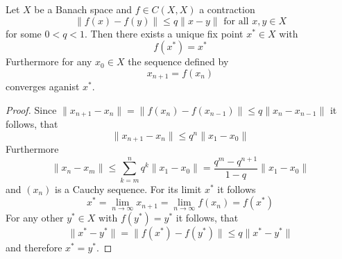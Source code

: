 \begin{theorem}\label{thm:banach_fix_point}
    Let \( X \) be a Banach space and \( f \in C(X,X) \) a contraction
    \[
        \|f(x) - f(y)\| \le q \|x - y\| \text{ for all } x, y \in X
    \]
    for some \( 0 < q < 1 \). Then there exists a unique fix point \( x^* \in X \) with
    \[
        f(x^*) = x^*
    \]
    Furthermore for any \( x_0 \in X \) the sequence defined by
    \[
        x_{n+1} = f(x_n)
    \]
    converges aganist \( x^* \).
\end{theorem}

\begin{proof}
    Since \( \| x_{n+1} - x_n\| =\| f(x_n) - f(x_{n-1})\| \le q\| x_n - x_{n-1}\| \) it follows, that
    \[
        \| x_{n+1} - x_n\| \le q^n  \|x_1 - x_0\|
    \]
    Furthermore
    \[
        \| x_n - x_m\| \le \sum_{k=m}^n q^k \|x_1 - x_0\| = \frac{q^m - q^{n+1}}{1 - q} \|x_1 - x_0\|
    \]
    and \( (x_n) \) is a Cauchy sequence. For its limit \( x^* \) it follows
    \[
        x^* = \lim_{n\to\infty} x_{n+1} = \lim_{n\to\infty} f(x_n) = f(x^*)
    \]
    For any other \( y^* \in X \) with \( f(y^*) = y^* \) it follows, that
    \[
        \|x^* - y^*\| = \|f(x^*) - f(y^*)\| \le q \|x^* - y^*\|
    \]
    and therefore \( x^* = y^*\).

\end{proof}
\bigskip

